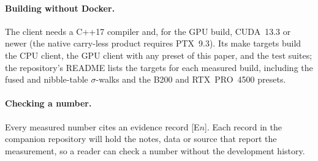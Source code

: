 \paragraph{Building without Docker.} The client needs a C++17 compiler
and, for the GPU build, CUDA~13.3 or newer (the native carry-less product
requires PTX~9.3). Its make targets build the CPU client, the GPU client
with any preset of this paper, and the test suites; the repository's
README lists the targets for each measured build, including the fused
and nibble-table $\sigma$-walks and the B200 and RTX~PRO~4500 presets.

\paragraph{Checking a number.} Every measured number cites an evidence
record [E$n$]. Each record in the companion repository will hold the
notes, data or source that report the measurement, so a reader can check
a number without the development history.
